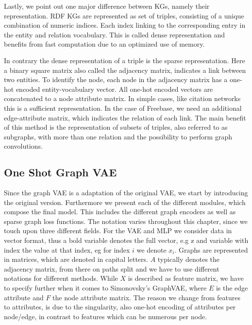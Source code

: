 Lastly, we point out one major difference between KGs, namely their representation. RDF KGs are represented as set of triples, consisting of a unique combination of numeric indices. Each index linking to the corresponding entry in the entity and relation vocabulary. This is called dense representation and benefits from fast computation due to an optimized use of memory.

In contrary the dense representation of a triple is the sparse representation. Here a binary square matrix also called the adjacency matrix, indicates a link between two entities. To identify the node, each node in the adjacency matrix has a one-hot encoded entity-vocabulary vector. All one-hot encoded vectors are concatenated to a node attribute matrix.
In simple cases, like citation networks this is a sufficient representation. In the case of Freebase, we need an additional edge-attribute matrix, which indicates the relation  of each link. The main benefit of this method is the representation of subsets of triples, also referred to as subgraphs, with more than one relation and the possibility to perform graph convolutions. 



\subsection{One Shot Graph VAE}

Since the graph VAE is a adaptation of the original VAE, we start by introducing the original version. Furthermore we present each of the different modules, which compose the final model. This includes the different graph encoders as well as sparse graph loss functions. The notation varies throughout this chapter, since we touch upon three different fields. For the VAE and MLP we consider data in vector format, thus a bold variable denotes the full vector, e.g $\mathbb{x}$ and variable with index the value at that index, eg for index $i$ we denote $x_i$. Graphs are represented in matrices, which are denoted in capital letters. $A$ typically denotes the adjacency matrix, from there on paths split and we have to use different notations for different methods. While $X$ is described as feature matrix, we have to specify further when it comes to Simonovsky's GraphVAE, where $E$ is the edge attribute and $F$ the node attribute matrix. The reason we change from features to attributes, is due to the singularity, also one-hot encoding of attributes per node/edge, in contrast to features which can be numerous per node.


